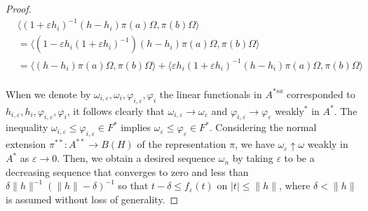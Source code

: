 \documentclass[a4paper]{amsart}
\newcommand{\e}{\varepsilon}
\theoremstyle{plain}
\theoremstyle{definition}
\begin{document}
\begin{proof}
\begin{align*}
&\langle(1+\e h_i)^{-1}(h-h_i)\pi(a)\Omega,\pi(b)\Omega\rangle\\
&=\langle(1-\e h_i(1+\e h_i)^{-1})(h-h_i)\pi(a)\Omega,\pi(b)\Omega\rangle\\
&=\langle(h-h_i)\pi(a)\Omega,\pi(b)\Omega\rangle+\langle\e h_i(1+\e h_i)^{-1}(h-h_i)\pi(a)\Omega,\pi(b)\Omega\rangle\\
\end{align*}

When we denote by $\omega_{i,\e},\omega_i,\varphi_{i,\e},\varphi_i$ the linear functionals in $A^{*sa}$ corresponded to $h_{i,\e},h_i,\varphi_{i,\e},\varphi_i$, it follows clearly that $\omega_{i,\e}\to\omega_\e$ and $\varphi_{i,\e}\to\varphi_\e$ weakly$^*$ in $A^*$.
The inequality $\omega_{i,\e}\le\varphi_{i,\e}\in F^*$ implies $\omega_\e\le\varphi_\e\in F^*$.
Considering the normal extension $\pi^{**}:A^{**}\to B(H)$ of the representation $\pi$, we have $\omega_\e\uparrow\omega$ weakly in $A^*$ as $\e\to0$.
Then, we obtain a desired sequence $\omega_n$ by taking $\e$ to be a decreasing sequence that converges to zero and less than $\delta\|h\|^{-1}(\|h\|-\delta)^{-1}$ so that $t-\delta\le f_\e(t)$ on $|t|\le\|h\|$, where $\delta<\|h\|$ is assumed without loss of generality.
\end{proof}
\end{document}
